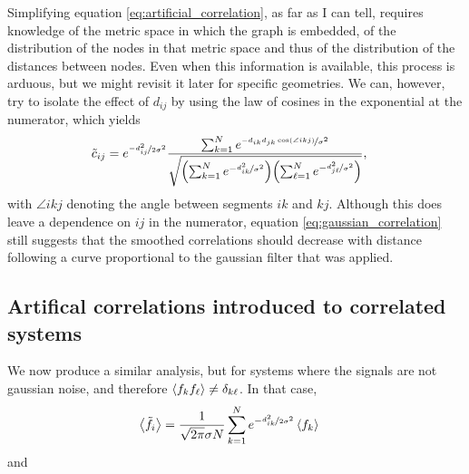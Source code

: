 \documentclass{article}
\begin{document}
\begin{multicols}{2}
Simplifying equation \ref{eq:artificial_correlation}, as far as I can tell, requires knowledge of the metric space in which the graph is embedded, of the distribution of the nodes in that metric space and thus of the distribution of the distances between nodes. Even when this information is available, this process is arduous, but we might revisit it later for specific geometries. We can, however, try to isolate the effect of $d_{ij}$ by using the law of cosines in the exponential at the numerator, which yields
\begin{align}
    \Tilde{c}_{ij} &= e^{\nicefrac{-d_{ij}^2}{2\sigma^2}}\frac{\sum_{k = 1}^N e^{\nicefrac{-d_{ik}d_{jk}\cos(\angle ikj)}{\sigma^2}}}{\sqrt{\qty(\sum_{k=1}^N e^{-\nicefrac{d_{ik}^2}{\sigma^2}})\qty(\sum_{\ell=1}^N e^{-\nicefrac{d_{j\ell}^2}{\sigma^2}})}},
    \label{eq:gaussian_correlation}
\end{align}
with $\angle ikj$ denoting the angle between segments $ik$ and $kj$. Although this does leave a dependence on $ij$ in the numerator, equation \ref{eq:gaussian_correlation} still suggests that the smoothed correlations should decrease with distance following a curve proportional to the gaussian filter that was applied.

\subsection*{Artifical correlations introduced to correlated systems}
We now produce a similar analysis, but for systems where the signals are not gaussian noise, and therefore $\expval{f_kf_\ell} \neq \delta_{k\ell}$. In that case,
\begin{align*}
     \expval{\Tilde{f_i}} &= \frac{1}{\sqrt{2\pi}\sigma N}\sum_{k=1}^N e^{-\nicefrac{d_{ik}^2}{2\sigma^2}}\expval{f_k}
\end{align*}
and


\end{multicols}
\end{document}
